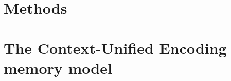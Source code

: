 \documentclass[
    paper=letter,
    12pt,
    titlepage,
    twoside,
    final,
    BCOR=10mm,
    DIV=9,
    listof=totoc]{scrbook}
\begin{document}
 
\mainmatter

\part{Methods}





\part{The Context-Unified Encoding memory model}\label{prt:cue}









\printbibliography[heading=bibintoc,title=References]

\appendix
{}




\end{document}
